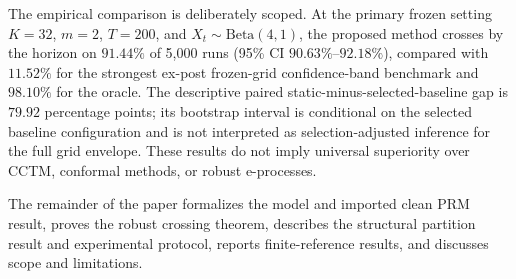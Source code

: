 The empirical comparison is deliberately scoped. At the primary frozen setting \(K=32\), \(m=2\), \(T=200\), and \(X_t\sim\mathrm{Beta}(4,1)\), the proposed method crosses by the horizon on \(91.44\%\) of 5,000 runs (95\% CI \(90.63\%\)--\(92.18\%\)), compared with \(11.52\%\) for the strongest ex-post frozen-grid confidence-band benchmark and \(98.10\%\) for the oracle. The descriptive paired static-minus-selected-baseline gap is \(79.92\) percentage points; its bootstrap interval is conditional on the selected baseline configuration and is not interpreted as selection-adjusted inference for the full grid envelope. These results do not imply universal superiority over CCTM, conformal methods, or robust e-processes.

The remainder of the paper formalizes the model and imported clean PRM result, proves the robust crossing theorem, describes the structural partition result and experimental protocol, reports finite-reference results, and discusses scope and limitations.
